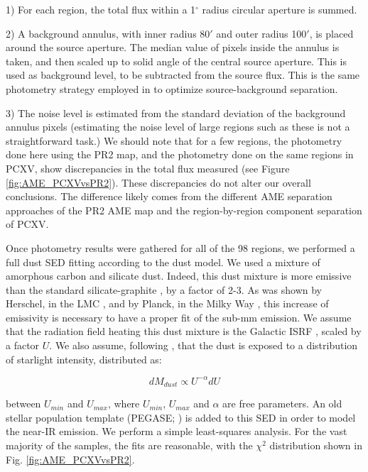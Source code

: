 \documentclass[preprint2,longabstract]{aastex}
\begin{document}
     1) For each region, the total flux within a 1$^{\circ}$ radius circular aperture is summed.

     2) A background annulus, with inner radius 80$'$ and outer radius 100$'$, is placed around the source aperture. The median value of pixels inside the annulus is taken, and then scaled up to solid angle of the central source aperture. This is used as background level, to be subtracted from the source flux. This is the same photometry strategy employed in \cite{planckXV} to optimize source-background separation.

     3) The noise level is estimated from the standard deviation of the background annulus pixels (estimating the noise level of large regions such as these is not a straightforward task.) We should note that for a few regions, the photometry done here using the PR2 map, and the photometry done on the same regions in PCXV, show discrepancies in the total flux measured (see Figure \ref{fig:AME_PCXVvsPR2}). These discrepancies do not alter our overall conclusions. The difference likely comes from the different AME separation approaches of the PR2 AME map and the region-by-region component separation of PCXV.

     Once photometry results were gathered for all of the 98 regions, we performed a full dust SED fitting according to the \cite{galliano11} dust model. We used a mixture of amorphous carbon and silicate dust. Indeed, this dust mixture is more emissive than the standard silicate-graphite \citep{draine07}, by a factor of 2-3. As was shown by Herschel, in the LMC \citep{galliano11}, and by Planck, in the Milky Way \citep{planck16}, this increase of emissivity is necessary to have a proper fit of the sub-mm emission. We assume that the radiation field heating this dust mixture is the Galactic ISRF \citep{math83}, scaled by a factor $U$. We also assume, following \cite{dale01}, that the dust is exposed to a distribution of starlight intensity, distributed as:

    \begin{equation}
        \label{eq:U}
          dM_{dust}\propto{} U^{-\alpha}dU
     \end{equation}

    between $U_{min}$ and $U_{max}$, where $U_{min}$, $U_{max}$ and $\alpha{}$ are free parameters. An old stellar population template (PEGASE; \citep{fioc97}) is added to this SED in order to model the near-IR emission. We perform a simple least-squares analysis. For the vast majority of the samples, the fits are reasonable, with the $\chi{}^{2}$ distribution shown in Fig. \ref{fig:AME_PCXVvsPR2}.
\end{document}
